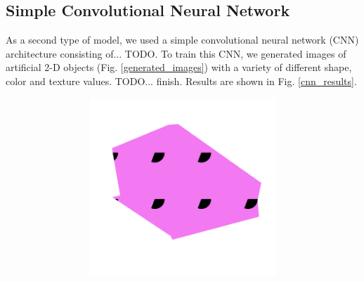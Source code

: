 \subsection{Simple Convolutional Neural Network}
As a second type of model, we used a simple convolutional neural network (CNN) architecture
consisting of... TODO. To train this CNN, we generated images of artificial 2-D objects
(Fig. \ref{generated_images}) with a variety of different shape, color and texture values. TODO... finish.
Results are shown in Fig. \ref{cnn_results}.

\begin{figure}[h!]
    \begin{subfigure}[b]{0.4\textwidth}
        \begin{center}
            \begin{subfigure}[b]{0.48\textwidth}
                \includegraphics[width=\linewidth]{figures/img0000.png}
            \end{subfigure}
            \begin{subfigure}[b]{0.5\textwidth}

\end{subfigure}
\end{center}
\end{subfigure}
\end{figure}
